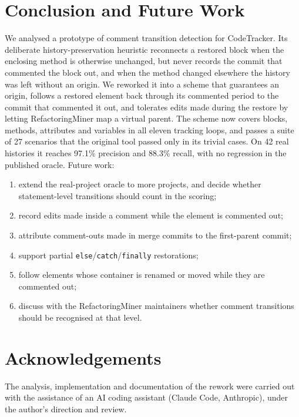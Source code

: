 \documentclass[11pt,a4paper]{article}
\newcommand{\code}[1]{\texttt{#1}}
\begin{document}
\section{Conclusion and Future Work}
We analysed a prototype of comment transition detection for CodeTracker. Its deliberate history-preservation heuristic reconnects a restored block when the enclosing method is otherwise unchanged, but never records the commit that commented the block out, and when the method changed elsewhere the history was left without an origin. We reworked it into a scheme that guarantees an origin, follows a restored element back through its commented period to the commit that commented it out, and tolerates edits made during the restore by letting RefactoringMiner map a virtual parent. The scheme now covers blocks, methods, attributes and variables in all eleven tracking loops, and passes a suite of 27 scenarios that the original tool passed only in its trivial cases. On 42 real histories it reaches 97.1\% precision and 88.3\% recall, with no regression in the published oracle. Future work:
\begin{enumerate}
  \item extend the real-project oracle to more projects, and decide whether statement-level transitions should count in the scoring;
  \item record edits made inside a comment while the element is commented out;
  \item attribute comment-outs made in merge commits to the first-parent commit;
  \item support partial \code{else}/\code{catch}/\code{finally} restorations;
  \item follow elements whose container is renamed or moved while they are commented out;
  \item discuss with the RefactoringMiner maintainers whether comment transitions should be recognised at that level.
\end{enumerate}

\section*{Acknowledgements}
The analysis, implementation and documentation of the rework were carried out with the assistance of an AI coding assistant (Claude Code, Anthropic), under the author's direction and review.
\end{document}
